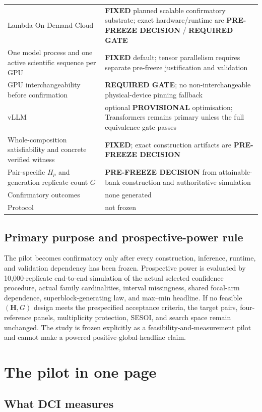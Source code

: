 \documentclass[11pt,a4paper]{article}
\newcommand{\FIXED}{\textbf{FIXED}}
\newcommand{\PROV}{\textbf{PROVISIONAL}}
\newcommand{\PFD}{\textbf{PRE-FREEZE DECISION}}
\newcommand{\GATE}{\textbf{REQUIRED GATE}}
\begin{document}
\begin{longtable}{p{}p{}}
Lambda On-Demand Cloud & \FIXED{} planned scalable confirmatory substrate; exact hardware/runtime are \PFD{} / \GATE{} \\
One model process and one active scientific sequence per GPU & \FIXED{} default; tensor parallelism requires separate pre-freeze justification and validation \\
GPU interchangeability before confirmation & \GATE{}; no non-interchangeable physical-device pinning fallback \\
vLLM & optional \PROV{} optimisation; Transformers remains primary unless the full equivalence gate passes \\
Whole-composition satisfiability and concrete verified witness & \FIXED{}; exact construction artifacts are \PFD{} \\
Pair-specific $H_p$ and generation replicate count $G$ & \PFD{} from attainable-bank construction and authoritative simulation \\
Confirmatory outcomes & none generated \\
Protocol & not frozen \\
\bottomrule
\end{longtable}

\subsection{Primary purpose and prospective-power rule}
The pilot becomes confirmatory only after every construction, inference, runtime, and validation dependency has been frozen. Prospective power is evaluated by 10,000-replicate end-to-end simulation of the actual selected confidence procedure, actual family cardinalities, interval missingness, shared focal-arm dependence, superblock-generating law, and max--min headline. If no feasible $(\mathbf H,G)$ design meets the prespecified acceptance criteria, the target pairs, four-reference panels, multiplicity protection, SESOI, and search space remain unchanged. The study is frozen explicitly as a feasibility-and-measurement pilot and cannot make a powered positive-global-headline claim.

\section{The pilot in one page}

\subsection{What DCI measures}
\end{document}
